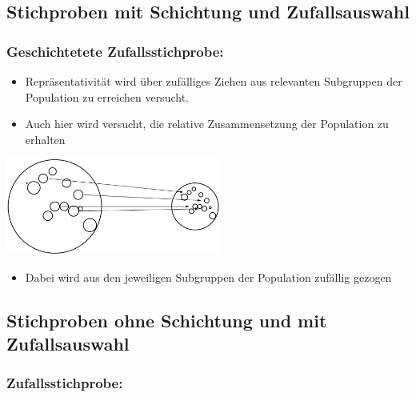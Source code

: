 \documentclass[
]{book}
\providecommand{\tightlist}{%
  \setlength{\itemsep}{0pt}\setlength{\parskip}{0pt}}
\begin{document}
\hypertarget{stichproben-mit-schichtung-und-zufallsauswahl}{%
\subsection{Stichproben mit Schichtung und Zufallsauswahl}\label{stichproben-mit-schichtung-und-zufallsauswahl}}

\hypertarget{geschichtetete-zufallsstichprobe}{%
\subsubsection{Geschichtetete Zufallsstichprobe:}\label{geschichtetete-zufallsstichprobe}}

\begin{itemize}
\tightlist
\item
  Repräsentativität wird über zufälliges Ziehen aus relevanten Subgruppen der Population zu erreichen versucht.
\item
  Auch hier wird versucht, die relative Zusammensetzung der Population zu erhalten
\end{itemize}

\begin{center}\includegraphics[width=200pt]{imgs/schichtung_zufall2} \end{center}

\begin{itemize}
\tightlist
\item
  Dabei wird aus den jeweiligen Subgruppen der Population zufällig gezogen
\end{itemize}

\hypertarget{stichproben-ohne-schichtung-und-mit-zufallsauswahl}{%
\subsection{Stichproben ohne Schichtung und mit Zufallsauswahl}\label{stichproben-ohne-schichtung-und-mit-zufallsauswahl}}

\hypertarget{zufallsstichprobe}{%
\subsubsection{Zufallsstichprobe:}\label{zufallsstichprobe}}
\end{document}
